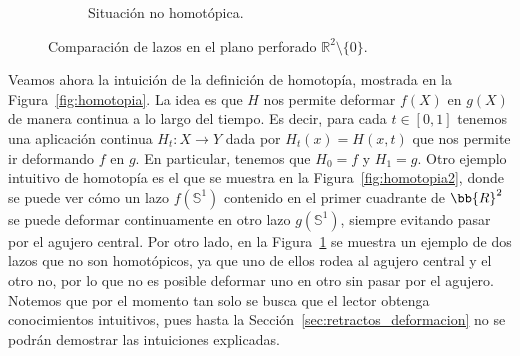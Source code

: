 \begin{figure}
\begin{subfigure}[b]{0.48\textwidth}
        \caption{Situación no homotópica.}
        \label{fig:no_homotopia}
    \end{subfigure}
    
    \caption{Comparación de lazos en el plano perforado $\mathbb{R}^2 \setminus \{0\}$.}
    \label{fig:comparacion_homotopias}
\end{figure}
Veamos ahora la intuición de la definición de homotopía, mostrada en la Figura~\ref{fig:homotopia}. La idea es que $H$ nos permite deformar $f(X)$ en $g(X)$ de manera continua a lo largo del tiempo. Es decir, para cada $t\in [0,1]$ tenemos una aplicación continua $H_t:X\to Y$ dada por $H_t(x) = H(x,t)$ que nos permite ir deformando $f$ en $g$. En particular, tenemos que $H_0 = f$ y $H_1 = g$. Otro ejemplo intuitivo de homotopía es el que se muestra en la Figura~\ref{fig:homotopia2}, donde se puede ver cómo un lazo $f(\mathbb{S}^1)$ contenido en el primer cuadrante de $\bb{R}^2$ se puede deformar continuamente en otro lazo $g(\mathbb{S}^1)$, siempre evitando pasar por el agujero central. Por otro lado, en la Figura~\ref{fig:no_homotopia} se muestra un ejemplo de dos lazos que no son homotópicos, ya que uno de ellos rodea al agujero central y el otro no, por lo que no es posible deformar uno en otro sin pasar por el agujero. Notemos que por el momento tan solo se busca que el lector obtenga conocimientos intuitivos, pues hasta la Sección~\ref{sec:retractos_deformacion} no se podrán demostrar las intuiciones explicadas.
